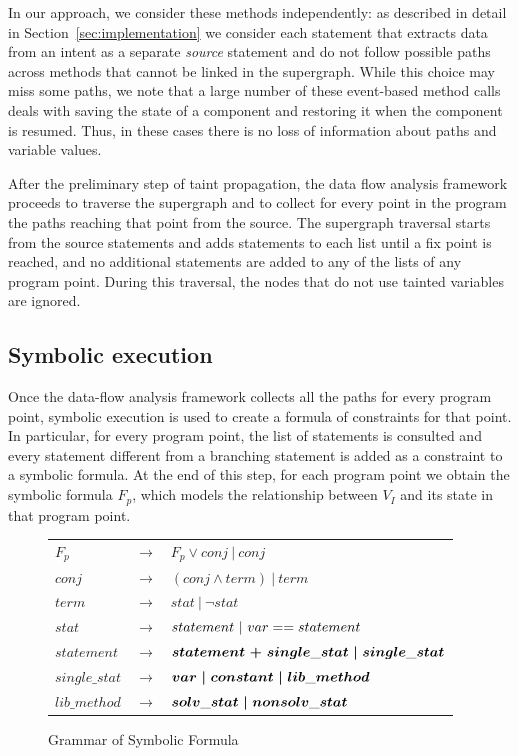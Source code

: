In our approach, we consider these methods independently: as described in detail in Section~\ref{sec:implementation} we consider each statement that extracts data from an intent as a separate \textit{source} statement and do not follow possible paths across methods that cannot be linked in the supergraph. While this choice may miss some paths, we note that a large number of these event-based method calls deals with saving the state of a component and restoring it when the component is resumed. Thus, in these cases there is no loss of information about paths and variable values.

After the preliminary step of taint propagation, the data flow analysis framework proceeds to traverse the supergraph and to collect for every point in the program the paths reaching that point from the source. The supergraph traversal starts from the source statements and adds statements to each list until a fix point is reached, and no additional statements are added to any of the lists of any program point. During this traversal, the nodes that do not use tainted variables are ignored. 


\subsection{Symbolic execution} Once the data-flow analysis framework collects all the paths for every program point, symbolic execution is used to create a formula of constraints for that point. In particular, for every program point, the list of statements is consulted and every statement different from a branching statement is added as a constraint to a symbolic formula. At the end of this step, for each program point we obtain the symbolic formula $F_p$, which models the relationship between $V_I$ and its state in that program point. 

\begin{figure}[h]
  \centering
		\begin{tabular}{lll}
			$F_p$  & $\rightarrow$ & $F_{p} \vee conj \ \vert \ conj$ \\
			$conj$ & $\rightarrow$ & $(conj \wedge term)\ \vert\ term$ \\
			$term$ & $\rightarrow$ & $stat\ \vert\ \neg stat$ \\
			$stat$ & $\rightarrow$ & $statement\ \vert\ \boldmath{var} == statement$\\
			$statement$ & $\rightarrow$ & $statement\ \boldmath{+}\ single\_stat\ \vert\ single\_stat$\\
			$single\_stat$ & $\rightarrow$ & $\boldmath{var}\ \vert\ \boldmath{constant}\ \vert\ lib\_method$ \\
			$lib\_method$ & $\rightarrow$ & $\boldmath{solv\_stat}\ \vert\ \boldmath{nonsolv\_stat}$ \\
		\end{tabular}
  	\caption{Grammar of Symbolic Formula}
	\label{fig:grammar}
 \end{figure}

